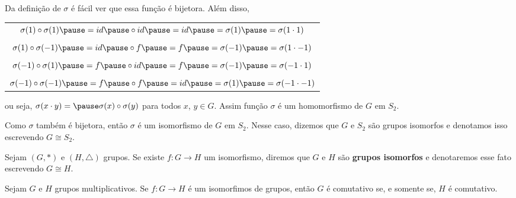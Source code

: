 \documentclass{beamer}
\begin{document}
    \begin{frame}
        Da definição de $\sigma$ \pause é fácil ver que essa função é bijetora. \pause Além disso, \pause
        \begin{center}
            \begin{tabular}{c}
                $\sigma(1) \circ \sigma(1) \pause = id \pause \circ id \pause = id \pause = \sigma(1) \pause = \sigma(1 \cdot 1)$\pause\\
                \\
                $\sigma(1) \circ \sigma(-1) \pause = id \pause \circ f \pause = f \pause = \sigma(-1) \pause = \sigma(1 \cdot -1)$ \pause\\
                \\
                $\sigma(-1) \circ \sigma(1) \pause = f \pause \circ id \pause = f \pause = \sigma(-1) \pause = \sigma(-1 \cdot 1)$ \pause\\
                \\
                $\sigma(-1) \circ \sigma(-1) \pause = f \pause \circ f \pause = id \pause = \sigma(1) \pause = \sigma(-1 \cdot -1)$ \pause\\
            \end{tabular}
        \end{center}
        ou seja, $\sigma(x\cdot y) = \pause \sigma(x) \circ \sigma(y)$ \pause para todos $x$, $y \in G$. \pause Assim função $\sigma$ é um homomorfismo de $G$ em $S_2$. \pause

        \vspace{.3cm}

        Como $\sigma$ também é bijetora, \pause então $\sigma$ é um isomorfismo \pause de $G$ em $S_2$. \pause Nesse caso, dizemos que $G$ e $S_2$ são grupos isomorfos \pause e denotamos isso escrevendo $G \cong S_2$.
    \end{frame}

    \begin{frame}
        \begin{definicao}
            Sejam $(G, *)$ e $(H, \triangle)$ grupos. \pause Se existe $f : G \to H$ um isomorfismo, \pause diremos que $G$ e $H$ são \textbf{grupos isomorfos} \pause e denotaremos esse fato escrevendo $G \cong H$.
        \end{definicao}
    \end{frame}

    \begin{frame}
        \begin{proposicao}
            Sejam $G$ e $H$ grupos multiplicativos. \pause Se $f : G \to H$ é um isomorfimos de grupos, então \pause $G$ é comutativo se, e somente se, $H$ é comutativo.
        \end{proposicao}
    \end{frame}
\end{document}
